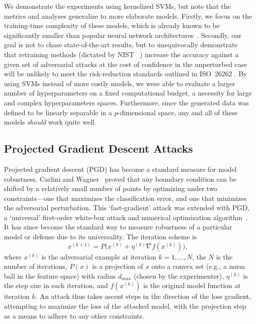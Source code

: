 \documentclass[runningheads]{llncs}
\begin{document}
We demonstrate the experiments using kernelized SVMs, but note that the metrics and analyses generalize to more elaborate models. Firstly, we focus on the training-time complexity of these models, which is already known to be significantly smaller than popular neural network architectures~\cite{bienstock2018principled}. Secondly, our goal is not to chase state-of-the-art results, but to unequivocally demonstrate that retraining methods (dictated by NIST ~\cite{falco2006using}) increase the accuracy against a given set of adversarial attacks at the cost of confidence in the unperturbed case will be unlikely to meet the risk-reduction standards outlined in ISO~26262 \cite{iso26262}.
By using SVMs instead of more costly models, we were able to evaluate a larger number of hyperparameters on a fixed computational budget, a necessity for large and complex hyperparameters spaces. Furthermore, since the generated data was defined to be linearly separable in a $p$-dimensional space, any and all of these models \textit{should} work quite well. 

\subsection{Projected Gradient Descent Attacks}

Projected gradient descent (PGD) has become a standard measure for model robustness. Carlini and Wagner~\cite{carlini2017towards} proved that any boundary condition can be shifted by a relatively small number of points by optimizing under two constraints---one that maximizes the classification error, and one that minimizes the adversarial perturbation. This `fast-gradient' attack was extended with PGD, a `universal' first-order white-box attack and numerical optimization algorithm~\cite{madry2017towards}. It has since become the standard way to measure robustness of a particular model or defense due to its universality. The iteration scheme is
$$
    x^{(k+1)} = P\big(x^{(k)} + \eta^{(k)} \nabla f(x^{(k)})\big),
$$
where $x^{(k)}$ is the adversarial example at iteration $k = 1,\ldots,N$, the $N$ is the number of iterations, $P(x)$ is a projection of $x$ onto a convex set (e.g., a norm ball in the feature space) with radius $d_{max}$ (chosen by the experimenter), $\eta^{(k)}$ is the step size in each iteration, and $f(x^{(k)})$ is the original model function at iteration $k$. An attack thus takes ascent steps in the direction of the loss gradient, attempting to maximize the loss of the attacked model, with the projection step as a means to adhere to any other constraints.
\end{document}
